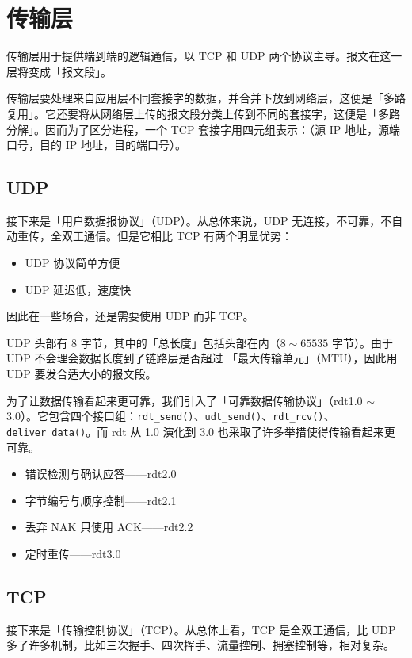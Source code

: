 \documentclass[UTF8]{ctexart}
\newcommand\Concept[1]{\textcolor{cyan!70!black}{#1}}
\begin{document}
\section{传输层}
传输层用于提供端到端的逻辑通信，以 TCP 和 UDP 两个协议主导。报文在这一层将变成「报文段」。

传输层要处理来自应用层不同套接字的数据，并合并下放到网络层，这便是「多路复用」。它还要将从网络层上传的报文段分类上传到不同的套接字，这便是「多路分解」。因而为了区分进程，一个 TCP 套接字用四元组表示：（源 IP 地址，源端口号，目的 IP 地址，目的端口号）。

\subsection{UDP}
接下来是\Concept{「用户数据报协议」（UDP）}。从总体来说，UDP 无连接，不可靠，不自动重传，全双工通信。但是它相比 TCP 有两个明显优势：
\begin{itemize}[itemsep=0pt,parsep=0pt]
  \item UDP 协议简单方便
  \item UDP 延迟低，速度快
\end{itemize}
因此在一些场合，还是需要使用 UDP 而非 TCP。

UDP 头部有 8 字节，其中的「总长度」包括头部在内（$8\sim 65535$ 字节）。由于 UDP 不会理会数据长度到了链路层是否超过 \Concept{「最大传输单元」（MTU）}，因此用 UDP 要发合适大小的报文段。

为了让数据传输看起来更可靠，我们引入了\Concept{「可靠数据传输协议」（rdt1.0 $\sim$ 3.0）}。它包含四个接口组：\verb!rdt_send()!、\verb!udt_send()!、\verb!rdt_rcv()!、\verb!deliver_data()!。而 rdt 从 1.0 演化到 3.0 也采取了许多举措使得传输看起来更可靠。
\begin{itemize}[itemsep=0pt,parsep=0pt]
    \item 错误检测与确认应答——rdt2.0
    \item 字节编号与顺序控制——rdt2.1
    \item 丢弃 NAK 只使用 ACK——rdt2.2
    \item 定时重传——rdt3.0
\end{itemize}

\subsection{TCP}
接下来是\Concept{「传输控制协议」（TCP）}。从总体上看，TCP 是全双工通信，比 UDP 多了许多机制，比如三次握手、四次挥手、流量控制、拥塞控制等，相对复杂。
\end{document}
